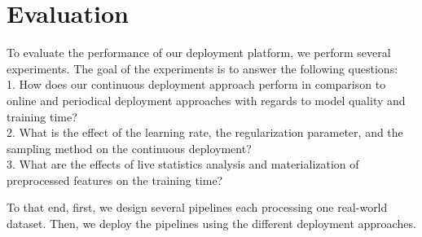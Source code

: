 \section{Evaluation} \label{evaluation} 
To evaluate the performance of our deployment platform, we perform several experiments.
The goal of the experiments is to answer the following questions:\\
1. How does our continuous deployment approach perform in comparison to online and periodical deployment approaches with regards to model quality and training time? \\
2. What is the effect of the learning rate, the regularization parameter, and the sampling method on the continuous deployment? \\
3. What are the effects of live statistics analysis and materialization of preprocessed features on the training time?

To that end, first, we design several pipelines each processing one real-world dataset.
Then, we deploy the pipelines using the different deployment approaches.

